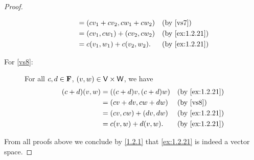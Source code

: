 \begin{proof}
\begin{description}
\begin{align*}
                                                  & = \p{cv_{1} + cv_{2}, cw_{1} + cw_{2}}      &  & \text{(by \ref{vs7})}        \\
                                                  & = \p{cv_{1}, cw_{1}} + \p{cv_{2}, cw_{2}}   &  & \text{(by \cref{ex:1.2.21})} \\
                                                  & = c\p{v_{1}, w_{1}} + c\p{v_{2}, w_{2}}.    &  & \text{(by \cref{ex:1.2.21})}
      \end{align*}
    \item[For \ref{vs8}:]
      For all \(c, d \in \mathbf{F}\), \(\left\lparen v, w\right\rparen \in \mathsf{V} \times \mathsf{W}\), we have
      \begin{align*}
        \p{c + d} \p{v, w} & = \p{\p{c + d} v, \p{c + d} w} &  & \text{(by \cref{ex:1.2.21})} \\
                           & = \p{cv + dv, cw + dw}         &  & \text{(by \ref{vs8})}        \\
                           & = \p{cv, cw} + \p{dv, dw}      &  & \text{(by \cref{ex:1.2.21})} \\
                           & = c\p{v, w} + d\p{v, w}.       &  & \text{(by \cref{ex:1.2.21})}
      \end{align*}
  \end{description}
  From all proofs above we conclude by \cref{1.2.1} that \cref{ex:1.2.21} is indeed a vector space.
\end{proof}
